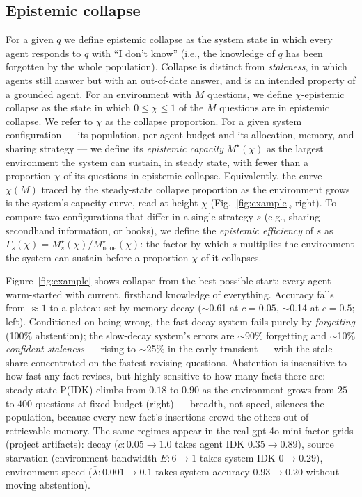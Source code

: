 \documentclass[10pt]{article}
\begin{document}
\subsection{Epistemic collapse}
\label{sec:collapse}
For a given $ q $ we define epistemic collapse as the system state in which every agent responds to $ q $ with ``I don't know'' (i.e., the knowledge of $ q $ has been forgotten by the whole population).
Collapse is distinct from \emph{staleness}, in which agents still answer but with an out-of-date answer, and is an intended property of a grounded agent.
For an environment with $ M $ questions, we define $ \chi $-epistemic collapse as the state in which  $ 0 \le \chi\le 1 $ of the $ M $ questions are in epistemic collapse.
We refer to $ \chi $ as the collapse proportion.
For a given system configuration --- its population, per-agent budget and its allocation, memory, and sharing strategy --- we define its \emph{epistemic capacity} $ M^\star(\chi) $ as the largest environment the system can sustain, in steady state, with fewer than a proportion $ \chi $ of its questions in epistemic collapse.
Equivalently, the curve $ \chi(M) $ traced by the steady-state collapse proportion as the environment grows is the system's capacity curve, read at height $ \chi $ (Fig.~\ref{fig:example}, right).
To compare two configurations that differ in a single strategy $ s $ (e.g., sharing secondhand information, or books), we define the \emph{epistemic efficiency} of $ s $ as $ \Gamma_s(\chi) = M^\star_s(\chi) / M^\star_{\text{none}}(\chi) $: the factor by which $ s $ multiplies the environment the system can sustain before a proportion $ \chi $ of it collapses.

Figure~\ref{fig:example} shows collapse from the best possible start: every agent warm-started with current, firsthand knowledge of everything. Accuracy falls from $\approx 1$ to a plateau set by memory decay ($\sim$0.61 at $c=0.05$, $\sim$0.14 at $c=0.5$; left). Conditioned on being wrong, the fast-decay system fails purely by \emph{forgetting} (100\% abstention); the slow-decay system's errors are $\sim$90\% forgetting and $\sim$10\% \emph{confident staleness} --- rising to $\sim$25\% in the early transient --- with the stale share concentrated on the fastest-revising questions. Abstention is insensitive to how fast any fact revises, but highly sensitive to how many facts there are: steady-state P(IDK) climbs from $0.18$ to $0.90$ as the environment grows from $25$ to $400$ questions at fixed budget (right) --- breadth, not speed, silences the population, because every new fact's insertions crowd the others out of retrievable memory. The same regimes appear in the real gpt-4o-mini factor grids (project artifacts): decay ($c: 0.05 \to 1.0$ takes agent IDK $0.35 \to 0.89$), source starvation (environment bandwidth $E: 6 \to 1$ takes system IDK $0 \to 0.29$), environment speed ($\bar\lambda: 0.001 \to 0.1$ takes system accuracy $0.93 \to 0.20$ without moving abstention).
\end{document}
